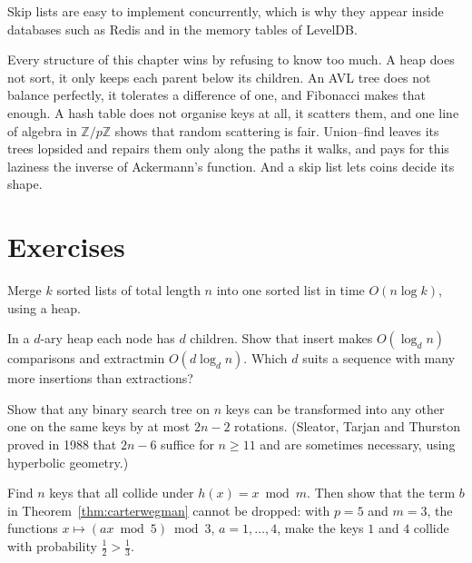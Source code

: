 Skip lists are easy to implement concurrently, which is why they appear inside databases such as Redis and in the memory tables of LevelDB.

\begin{beauty}
Every structure of this chapter wins by refusing to know too much. A heap does not sort, it only keeps each parent below its children. An AVL tree does not
balance perfectly, it tolerates a difference of one, and Fibonacci makes that enough. A hash table does not organise keys at all, it scatters them, and one
line of algebra in $\mathbb Z/p\mathbb Z$ shows that random scattering is fair. Union--find leaves its trees lopsided and repairs them only along the paths it walks, and pays
for this laziness the inverse of Ackermann's function. And a skip list lets coins decide its shape.
\end{beauty}

\section{Exercises}

\begin{exercise}[$\star$]\label{ex:kmerge}
Merge $k$ sorted lists of total length $n$ into one sorted list in time $O(n\log k)$, using a heap.
\end{exercise}

\begin{exercise}[$\star$]\label{ex:dheap}
In a $d$-ary heap each node has $d$ children. Show that insert makes $O(\log_dn)$ comparisons and extractmin $O(d\log_dn)$. Which $d$ suits a sequence with many
more insertions than extractions?
\end{exercise}

\begin{exercise}[$\star\star$]\label{ex:rotations}
Show that any binary search tree on $n$ keys can be transformed into any other one on the same keys by at most $2n-2$ rotations. (Sleator, Tarjan and Thurston proved in
1988 that $2n-6$ suffice for $n\ge11$ and are sometimes necessary, using hyperbolic geometry.)
\end{exercise}

\begin{exercise}[$\star$]\label{ex:notuniversal}
Find $n$ keys that all collide under $h(x)=x\bmod m$. Then show that the term $b$ in Theorem~\ref{thm:carterwegman} cannot be dropped: with $p=5$ and $m=3$, the functions
$x\mapsto(ax\bmod 5)\bmod 3$, $a=1,\dots,4$, make the keys $1$ and $4$ collide with probability $\frac12>\frac13$.
\end{exercise}

